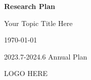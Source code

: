 \begin{titlepage}
    \begin{center}
        \vspace*{3cm}
            
        \Huge
        \textbf{Research Plan}
            
        \vspace{1cm}
        \huge
        Your Topic Title Here
        
        
            
        \vspace{1.5cm}
        \Large
        
        \authorinfo
        
        \today
        
            
        \vfill
        
        \supervisorinfo
        
        2023.7-2024.6 Annual Plan
            
        \vspace{1cm}
        
       	LOGO HERE
        
        \Large
            
    \end{center}
\end{titlepage}